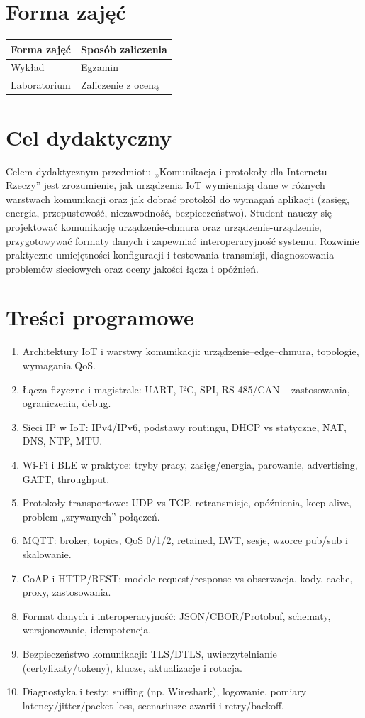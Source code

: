 \documentclass[12pt, a4paper]{article}
\begin{document}
\section{Forma zajęć}

\begin{tabular}{ll}
  \hline
  \textbf{Forma zajęć} & \textbf{Sposób zaliczenia} \\
  \hline
  Wykład & Egzamin \\
  Laboratorium & Zaliczenie z oceną \\
  \hline
\end{tabular}

\section{Cel dydaktyczny}

Celem dydaktycznym przedmiotu „Komunikacja i protokoły dla Internetu Rzeczy” jest zrozumienie, jak urządzenia IoT wymieniają dane w różnych warstwach komunikacji oraz jak dobrać protokół do wymagań aplikacji (zasięg, energia, przepustowość, niezawodność, bezpieczeństwo). Student nauczy się projektować komunikację urządzenie-chmura oraz urządzenie-urządzenie, przygotowywać formaty danych i zapewniać interoperacyjność systemu. Rozwinie praktyczne umiejętności konfiguracji i testowania transmisji, diagnozowania problemów sieciowych oraz oceny jakości łącza i opóźnień.

\section{Treści programowe}

\begin{enumerate}
  \item Architektury IoT i warstwy komunikacji: urządzenie–edge–chmura, topologie, wymagania QoS.
  \item Łącza fizyczne i magistrale: UART, I²C, SPI, RS-485/CAN – zastosowania, ograniczenia, debug.
  \item Sieci IP w IoT: IPv4/IPv6, podstawy routingu, DHCP vs statyczne, NAT, DNS, NTP, MTU.
  \item Wi-Fi i BLE w praktyce: tryby pracy, zasięg/energia, parowanie, advertising, GATT, throughput.
  \item Protokoły transportowe: UDP vs TCP, retransmisje, opóźnienia, keep-alive, problem „zrywanych” połączeń.
  \item MQTT: broker, topics, QoS 0/1/2, retained, LWT, sesje, wzorce pub/sub i skalowanie.
  \item CoAP i HTTP/REST: modele request/response vs obserwacja, kody, cache, proxy, zastosowania.
  \item Format danych i interoperacyjność: JSON/CBOR/Protobuf, schematy, wersjonowanie, idempotencja.
  \item Bezpieczeństwo komunikacji: TLS/DTLS, uwierzytelnianie (certyfikaty/tokeny), klucze, aktualizacje i rotacja.
  \item Diagnostyka i testy: sniffing (np. Wireshark), logowanie, pomiary latency/jitter/packet loss, scenariusze awarii i retry/backoff.
\end{enumerate}
\end{document}
